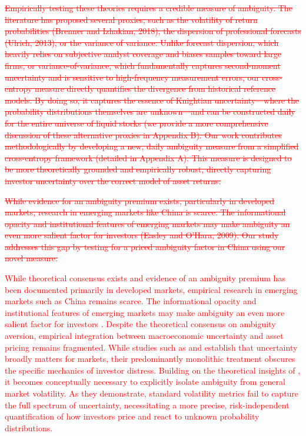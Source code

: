\documentclass[preprint,12pt,authoryear]{elsarticle}
\begin{document}
\textcolor{red}{\st{Empirically testing these theories requires a credible measure of ambiguity. The literature has proposed several proxies, such as the volatility of return probabilities (Brenner and Izhakian, 2018), the dispersion of professional forecasts (Ulrich, 2013), or the variance of variance. Unlike forecast dispersion, which heavily relies on subjective analyst coverage and biases samples toward large firms, or variance-of-variance, which fundamentally captures second-moment uncertainty and is sensitive to high-frequency measurement errors, our cross-entropy measure directly quantifies the divergence from historical reference models. By doing so, it captures the essence of Knightian uncertainty---where the probability distributions themselves are unknown---and can be constructed daily for the entire universe of liquid stocks (we provide a more comprehensive discussion of these alternative proxies in Appendix B). Our work contributes methodologically by developing a new, daily ambiguity measure from a simplified cross-entropy framework (detailed in Appendix A). This measure is designed to be more theoretically grounded and empirically robust, directly capturing investor uncertainty over the correct model of asset returns.}}

\textcolor{red}{\st{While evidence for an ambiguity premium exists, particularly in developed markets, research in emerging markets like China is scarce. The informational opacity and institutional features of emerging markets may make ambiguity an even more salient factor for investors (Easley and O’Hara, 2009). Our study addresses this gap by testing for a priced ambiguity factor in China using our novel measure.}}

\textcolor{red}{While theoretical consensus exists and evidence of an ambiguity premium has been documented primarily in developed markets, empirical research in emerging markets such as China remains scarce. The informational opacity and institutional features of emerging markets may make ambiguity an even more salient factor for investors \citep{Easley2009}. Despite the theoretical consensus on ambiguity aversion, empirical integration between macroeconomic uncertainty and asset pricing remains fragmented. While studies such as \citet{Baker2016} and \citet{Caldara2022} establish that uncertainty broadly matters for markets, their predominantly monolithic treatment obscures the specific mechanics of investor distress. Building on the theoretical insights of \citet{Brenner2018}, it becomes conceptually necessary to explicitly isolate ambiguity from general market volatility. As they demonstrate, standard volatility metrics fail to capture the full spectrum of uncertainty, necessitating a more precise, risk-independent quantification of how investors price and react to unknown probability distributions.}
\end{document}
